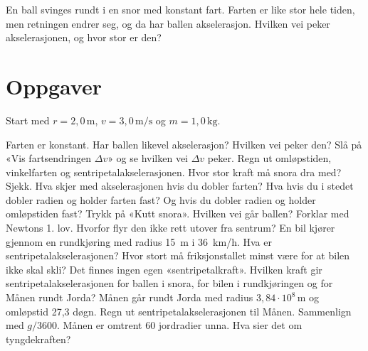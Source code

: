 \documentclass[11pt]{article}
\begin{document}

En ball svinges rundt i en snor med konstant fart. Farten er like stor hele tiden, men retningen endrer seg, og da har ballen akselerasjon. Hvilken vei peker akselerasjonen, og hvor stor er den?

\section*{Oppgaver}

Start med $r = 2{,}0\,\mathrm{m}$, $v = 3{,}0\,\mathrm{m/s}$ og $m = 1{,}0\,\mathrm{kg}$.

\begin{oppgaveliste}
\oppgave {}Farten er konstant. Har ballen likevel akselerasjon? Hvilken vei peker den? Slå på «Vis fartsendringen $Δv$» og se hvilken vei $Δv$ peker.
\svar
\oppgave {}Regn ut omløpstiden, vinkelfarten og sentripetalakselerasjonen. Hvor stor kraft må snora dra med? Sjekk.
\svar
\oppgave {}Hva skjer med akselerasjonen hvis du dobler farten? Hva hvis du i stedet dobler radien og holder farten fast? Og hvis du dobler radien og holder omløpstiden fast?
\svar
\oppgave {}Trykk på «Kutt snora». Hvilken vei går ballen? Forklar med Newtons 1. lov. Hvorfor flyr den ikke rett utover fra sentrum?
\svar
\oppgave {}En bil kjører gjennom en rundkjøring med radius 15~m i 36~km/h. Hva er sentripetalakselerasjonen? Hvor stort må friksjonstallet minst være for at bilen ikke skal skli?
\svar
\oppgave {}Det finnes ingen egen «sentripetalkraft». Hvilken kraft gir sentripetalakselerasjonen for ballen i snora, for bilen i rundkjøringen og for Månen rundt Jorda?
\svar
\oppgave {}Månen går rundt Jorda med radius $3{,}84 \cdot 10^{8}\,\mathrm{m}$ og omløpstid 27,3 døgn. Regn ut sentripetalakselerasjonen til Månen. Sammenlign med $g/3600$. Månen er omtrent 60 jordradier unna. Hva sier det om tyngdekraften?
\svar
\end{oppgaveliste}
\end{document}
